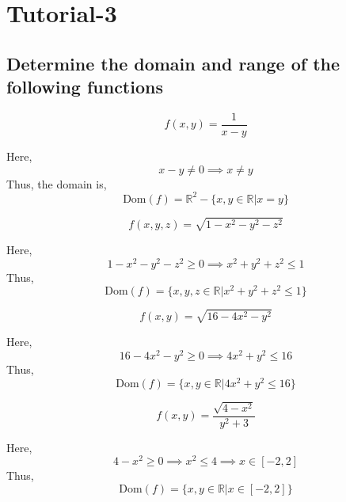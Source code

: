 \section{Tutorial-3}
\subsection{Determine the domain and range of the following functions}
\begin{asign}
	\[f(x,y)=\frac{1}{x-y}\]
\end{asign}
\begin{anse}
	Here,
	\[x-y\neq0\implies x\neq y\]
	Thus, the domain is,
	\[\text{Dom}(f)=\mathbb{R}^2-\{x,y \in \mathbb{R}| x= y\}\]
\end{anse}
\begin{asign}
	\[f(x,y,z)=\sqrt{1-x^2-y^2-z^2}\]
\end{asign}
\begin{anse}
	Here,
	\[1-x^2-y^2-z^2\geq 0\implies x^2+y^2+z^2\leq1\]
	Thus,
	\[\text{Dom}(f)=\{x,y,z\in \mathbb{R} | x^2+y^2+z^2\leq1\}\]
\end{anse}
\begin{asign}
	\[f(x,y)=\sqrt{16-4x^2-y^2}\]
\end{asign}
\begin{anse}
	Here,
	\[16-4x^2-y^2\geq0\implies4x^2+y^2\leq16\]
	Thus,
	\[\text{Dom}(f)=\{x,y\in\mathbb{R}| 4x^2+y^2\leq16\}\]
\end{anse}
\begin{asign}
	\[f(x,y)=\frac{\sqrt{4-x^2}}{y^2+3}\]
\end{asign}
\begin{anse}
	Here,
	\[4-x^2\geq0\implies x^2\leq4\implies x\in[-2,2]\]
	Thus,
	\[\text{Dom}(f)=\{x,y\in\mathbb{R}| x\in[-2,2]\}\]
\end{anse}
